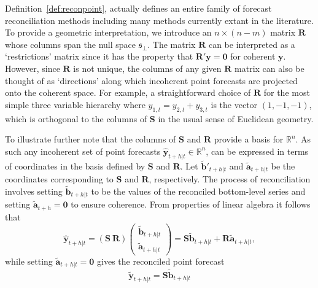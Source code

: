 \documentclass[a4paper, 11pt]{article}
\begin{document}
Definition~\ref{def:reconpoint}, actually defines an entire family of forecast reconciliation methods including many methods currently extant in the literature. To provide a geometric interpretation, we introduce an $n \times (n-m)$ matrix $\bm{R}$ whose columns span the null space $\mathfrak{s}_{\perp}$.  The matrix $\bm{R}$ can be interpreted as a `restrictions' matrix since it has the property that $\bm{R}'\bm{y}=\bm{0}$ for coherent $\bm{y}$. However, since $\bm{R}$ is not unique, the columns of any given $\bm{R}$ matrix can also be thought of as `directions' along which incoherent point forecasts are projected onto the coherent space. For example, a straightforward choice of $\bm{R}$ for the most simple three variable hierarchy where $y_{1,t}=y_{2,t}+y_{3,t}$ is the vector $(1,-1,-1)$, which is orthogonal to the columns of $\bm{S}$ in the usual sense of Euclidean geometry.
%


To illustrate further note that the columns of $\bm{S}$ and $\bm{R}$ provide a basis for $\mathbb{R}^n$.  As such any incoherent set of point forecasts $\hat{\bm{y}}_{t+h|t} \in \mathbb{R}^n$, can be expressed in terms of coordinates in the basis defined by $\bm{S}$ and $\bm{R}$. Let $\tilde{\bm{b}}'_{t+h|t}$ and $\tilde{\bm{a}}_{t+h|t}$ be the coordinates corresponding to $\bm{S}$ and $\bm{R}$, respectively. The process of reconciliation involves setting $\tilde{\bm{b}}_{t+h|t}$ to be the values of the reconciled bottom-level series and setting $\tilde{\bm{a}}_{t+h}=\bm{0}$ to ensure coherence. From properties of linear algebra it follows that 
\[
\hat{\bm{y}}_{t+h|t} = (\bm{S} ~ \bm{R})
\begin{pmatrix}
\tilde{\bm{b}}_{t+h|t}\\ \tilde{\bm{a}}_{t+h|t}
\end{pmatrix}= \bm{S}\tilde{\bm{b}}_{t+h|t} +  \bm{R}\tilde{\bm{a}}_{t+h|t},
\]
while setting $\tilde{\bm{a}}_{t+h|t}=\bm{0}$ gives the reconciled point forecast
\[
\tilde{\bm{y}}_{t+h|t} = \bm{S}\tilde{\bm{b}}_{t+h|t}
\]
\end{document}
